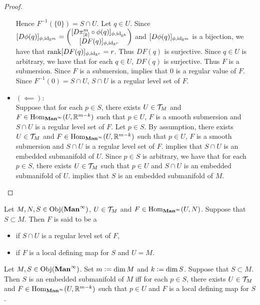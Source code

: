 \documentclass{book}
\begin{document}
\begin{proof}
\begin{itemize}
\begin{itemize}
			\end{itemize}
			Hence $F^{-1}(\{0\}) = S \cap U$. Let $q \in U$. Since $[D \phi (q)]_{\phi, \operatorname{id}_{\mathbb{R}^m}} = 
			\begin{pmatrix}
				[D \pi^m_{[k]} \circ \phi (q) ]_{\phi, \operatorname{id}_{\mathbb{R}^k}} \\
				[DF(q)]_{\phi, \operatorname{id}_{\mathbb{R}^r}} 
			\end{pmatrix}
			$ 
			and $[D \phi (q)]_{\phi, \operatorname{id}_{\mathbb{R}^m}}$ is a bijection, we have that $\operatorname{\text{rank}} [DF(q)]_{\phi, \operatorname{id}_{\mathbb{R}^r}} = r$. Thus $DF(q)$ is surjective. Since $q \in U$ is arbitrary, we have that for each $q \in U$, $DF(q)$ is surjective. Thus $F$ is a submersion. Since $F$ is a submersion, \rex{}  implies that $0$ is a regular value of $F$. Since $F^{-1}(0) = S \cap U$, $S \cap U$ is a regular level set of $F$. 
			\item $(\impliedby):$ \\
			Suppose that for each $p \in S$, there exists $U \in \mathcal{T}_M$ and $F \in \operatorname{Hom}_{\operatorname*{\text{\textbf{Man}}^{\infty}}}(U, \mathbb{R}^{m-k})$ such that $p \in U$, $F$ is a smooth submersion and $S \cap U$ is a regular level set of $F$. Let $p \in S$. By assumption, there exists $U \in \mathcal{T}_M$ and $F \in \operatorname{Hom}_{\operatorname*{\text{\textbf{Man}}^{\infty}}}(U, \mathbb{R}^{m-k})$ such that $p \in U$, $F$ is a smooth submersion and $S \cap U$ is a regular level set of $F$. \rex{}  implies that $S \cap U$ is an embedded submanifold of $U$. Since $p \in S$ is arbitrary, we have that for each $p \in S$, there exists $U \in \mathcal{T}_M$ such that $p \in U$ and $S \cap U$ is an embedded submanifold of $U$. \rex{}  implies that $S$ is an embedded submanifold of $M$.
		\end{itemize}
	\end{proof}
 
	\begin{defn} 
		Let $M, N, S \in \operatorname{Obj}(\operatorname*{\text{\textbf{Man}}^{\infty}})$, $U \in \mathcal{T}_M$ and $F \in \operatorname{Hom}_{\operatorname*{\text{\textbf{Man}}^{\infty}}}(U, N)$. Suppose that $S \subset M$. Then $F$ is said to be a 
		\begin{itemize}
			\item {} if $S \cap U$ is a regular level set of $F$, 
			\item {} if $F$ is a local defining map for $S$ and $U = M$.
		\end{itemize}
	\end{defn}

	\begin{ex} 
		Let $M, S \in \operatorname{Obj}(\operatorname*{\text{\textbf{Man}}^{\infty}})$. Set $m \vcentcolon= \dim M$ and $k \vcentcolon= \dim S$. Suppose that $S \subset M$. Then $S$ is an embedded submanifold of $M$ iff for each $p \in S$, there exists $U \in \mathcal{T}_M$ and $F \in \operatorname{Hom}_{\operatorname*{\text{\textbf{Man}}^{\infty}}}(U, \mathbb{R}^{m-k})$ such that $p \in U$ and $F$ is a local defining map for $S$.
	\end{ex}
\end{document}

